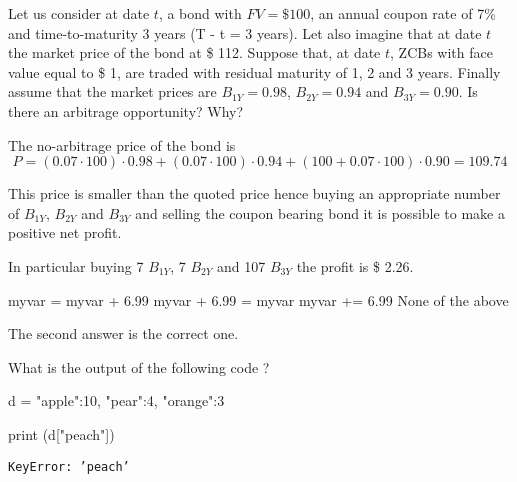 \documentclass[12pt,a4paper]{exam}
\begin{document}
\question
Let us consider at date $t$, a bond with $FV = \$ 100$, an annual coupon rate of 7\% and time-to-maturity 3 years (T - t = 3 years).
Let also imagine that at date $t$ the market price of the bond at \$ 112.
Suppose that, at date $t$, ZCBs with face value equal to \$ 1, are traded with residual maturity of 1, 2 and 3 years.
Finally assume that the market prices are $B_{1Y} = 0.98$, $B_{2Y} = 0.94$ and $B_{3Y} = 0.90$.
Is there an arbitrage opportunity? Why?
\fillwithlines{3cm}
\begin{solution}
The no-arbitrage price of the bond is
\begin{equation*}
  P = (0.07\cdot100)\cdot 0.98 + (0.07\cdot100)\cdot 0.94 + (100 + 0.07\cdot100)\cdot 0.90 = 109.74
\end{equation*}

This price is smaller than the quoted price hence buying an appropriate number of $B_{1Y}$, $B_{2Y}$ and $B_{3Y}$ and selling the coupon bearing bond it is possible to make a positive net profit.

In particular buying 7 $B_{1Y}$, 7 $B_{2Y}$ and 107 $B_{3Y}$ the profit is \$ 2.26.
\end{solution}


\begin{checkboxes}
\choice myvar = myvar + 6.99
\choice myvar + 6.99 = myvar
\choice myvar += 6.99
\choice None of the above
\end{checkboxes}
\begin{solution}
The second answer is the correct one.
\end{solution}


\question
What is the output of the following code ?

\begin{ipython}
d = {"apple":10, "pear":4, "orange":3}

print (d["peach"])
\end{ipython}
\makeemptybox{3cm}
\begin{solution}
\texttt{KeyError: 'peach'}
\end{solution}
\end{document}
